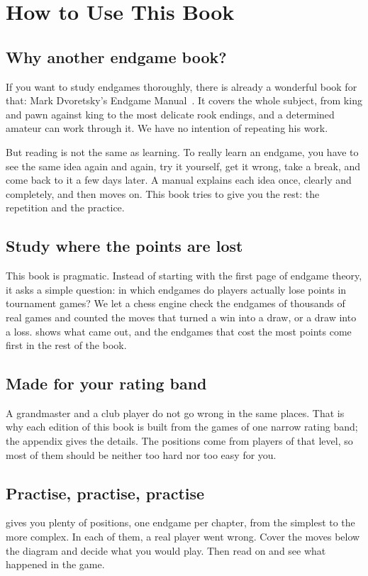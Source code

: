 \chapter{How to Use This Book}

\section*{Why another endgame book?}
If you want to study endgames thoroughly, there is already a wonderful book for that: Mark
Dvoretsky's Endgame Manual~\cite{Dvoretsky:2008-endgame-manual}. It covers the whole
subject, from king and pawn against king to the most delicate rook endings, and a determined
amateur can work through it. We have no intention of repeating his work.

But reading is not the same as learning. To really learn an endgame, you have to see the same
idea again and again, try it yourself, get it wrong, take a break, and come back to it a few days
later. A manual explains each idea once, clearly and completely, and then moves on. This book
tries to give you the rest: the repetition and the practice.

\section*{Study where the points are lost}
This book is pragmatic. Instead of starting with the first page of endgame theory, it asks a
simple question: in which endgames do players actually lose points in tournament games? We let
a chess engine check the endgames of thousands of real games and counted the moves that turned
a win into a draw, or a draw into a loss.  shows what came out, and
the endgames that cost the most points come first in the rest of the book.

\section*{Made for your rating band}
A grandmaster and a club player do not go wrong in the same places. That is why each edition of
this book is built from the games of one narrow rating band; the appendix gives the details. The
positions come from players of that level, so most of them should be neither too hard nor too
easy for you.

\section*{Practise, practise, practise}
 gives you plenty of positions, one endgame per chapter, from the
simplest to the more complex. In each of them, a real player went wrong. Cover the moves
below the diagram and decide what you would play. Then read on and see what happened in the game.

